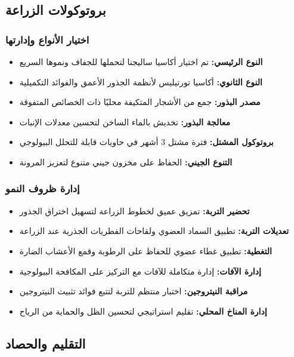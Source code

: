 \subsection{بروتوكولات الزراعة}

\subsubsection{اختيار الأنواع وإدارتها}
\begin{itemize}
    \item \textbf{النوع الرئيسي:} تم اختيار أكاسيا ساليجنا لتحملها للجفاف ونموها السريع
    \item \textbf{النوع الثانوي:} أكاسيا تورتيليس لأنظمة الجذور الأعمق والفوائد التكميلية
    \item \textbf{مصدر البذور:} جمع من الأشجار المتكيفة محليًا ذات الخصائص المتفوقة
    \item \textbf{معالجة البذور:} تخديش بالماء الساخن لتحسين معدلات الإنبات
    \item \textbf{بروتوكول المشتل:} فترة مشتل 3 أشهر في حاويات قابلة للتحلل البيولوجي
    \item \textbf{التنوع الجيني:} الحفاظ على مخزون جيني متنوع لتعزيز المرونة
\end{itemize}

\subsubsection{إدارة ظروف النمو}
\begin{itemize}
    \item \textbf{تحضير التربة:} تمزيق عميق لخطوط الزراعة لتسهيل اختراق الجذور
    \item \textbf{تعديلات التربة:} تطبيق السماد العضوي ولقاحات الفطريات الجذرية عند الزراعة
    \item \textbf{التغطية:} تطبيق غطاء عضوي للحفاظ على الرطوبة وقمع الأعشاب الضارة
    \item \textbf{إدارة الآفات:} إدارة متكاملة للآفات مع التركيز على المكافحة البيولوجية
    \item \textbf{مراقبة النيتروجين:} اختبار منتظم للتربة لتتبع فوائد تثبيت النيتروجين
    \item \textbf{إدارة المناخ المحلي:} تقليم استراتيجي لتحسين الظل والحماية من الرياح
\end{itemize}

\subsection{التقليم والحصاد}

